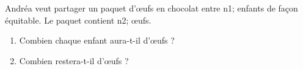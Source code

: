 \documentclass[exercice]{thedocument}%
\begin{document}
%
Andréa veut partager un paquet d'\oe ufs en chocolat entre \<n1; enfants de
façon équitable. Le paquet contient \<n2; \oe ufs.
\begin{enumerate}
    \item Combien chaque enfant aura-t-il d'\oe ufs ?
    \item Combien restera-t-il d'\oe ufs ?
\end{enumerate}
\end{document}
